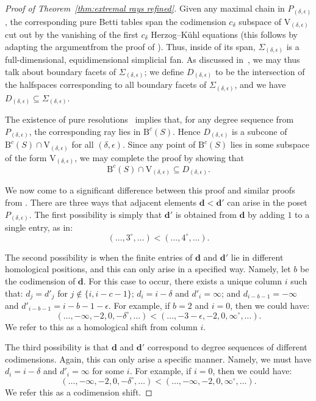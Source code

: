 \documentclass[12pt]{amsart}
\theoremstyle{definition}
\theoremstyle{remark}
\newcommand{\VV}{\mathrm{V}}
\newcommand{\cc}{c}
\newcommand{\dd}{\mathbf{d}}
\newcommand{\defi}[1]{\textsf{#1}} %
\newcommand{\BBQ}{\mathrm{B}}
\begin{document}
\begin{proof}[Proof of Theorem~\ref{thm:extremal rays refined}]
Given any maximal chain in $P_{(\delta,\epsilon)}$, the corresponding pure Betti tables span the codimension $c_{\delta}$ subspace of $\VV_{(\delta,\epsilon)}$ cut out by the vanishing of the first $c_{\delta}$ Herzog--K\"uhl equations (this follows by adapting the argumentfrom the proof of \cite[Proposition~1]{boij-sod2}).  
Thus, inside of its span, $\Sigma_{(\delta,\epsilon)}$ is a full-dimensional, equidimensional simplicial fan.  
As discussed in~\cite[Appendix]{bbeg}, we may thus talk about boundary facets of $\Sigma_{(\delta,\epsilon)}$; we define $D_{(\delta,\epsilon)}$ to be the intersection of the halfspaces corresponding to all boundary facets of $\Sigma_{(\delta,\epsilon)}$, and we have $D_{(\delta,\epsilon)} \subseteq \Sigma_{(\delta,\epsilon)}$.

The existence of pure resolutions~\cite[Theorem~0.1]{eis-schrey1} implies that, for any degree sequence from $P_{(\delta,\epsilon)}$, the corresponding ray lies in $\BBQ^{\cc}(S)$.  Hence $D_{(\delta,\epsilon)}$ is a subcone of $\BBQ^{\cc}(S)\cap \VV_{(\delta,\epsilon)}$ for all $(\delta,\epsilon)$.  
Since any point of $\BBQ^{\cc}(S)$ lies in some subspace of the form $\VV_{(\delta,\epsilon)}$, we may complete the proof by showing that
\begin{equation}\label{eqn:inclusion}
\BBQ^{\cc}(S)\cap \VV_{(\delta,\epsilon)} \subseteq D_{(\delta,\epsilon)}.
\end{equation}

We now come to a significant difference between this proof and similar proofs from \cites{eis-schrey1,boij-sod2}.  There are three ways that  adjacent elements $\dd<\dd'$ can arise in the poset $P_{(\delta,\epsilon)}$.   The first possibility is simply that $\dd'$ is obtained from $\dd$ by adding $1$ to a single entry, as in:
\[
(\dots,3^\circ,\dots)<(\dots,4^\circ,\dots).
\]

The second possibility is when the finite entries of $\dd$ and $\dd'$ lie in different homological positions, and this can only arise in a specified way.  Namely, let $b$ be the codimension of $\dd$.  For this case to occur, there exists a unique column $i$ such that: $d_j=d'_j$ for $j\notin \{i, i-c-1\}$; $d_i=i-\delta$ and $d'_i=\infty$; and $d_{i-b-1}=-\infty$ and $d'_{i-b-1}=i-b-1-\epsilon$.  For example, if $b=2$ and $i=0$, then we could have:
\[
(\dots, -\infty, -2, 0, -\delta^\circ, \dots)<(\dots, -3-\epsilon,-2, 0, \infty^\circ, \dots).
\]
We refer to this as a \defi{homological shift from column $i$}.

The third possibility is that $\dd$ and $\dd'$ correspond to degree sequences of different codimensions.  Again, this can only arise a specific manner.  Namely, we must have $d_{i}=i-\delta$ and $d'_i=\infty$ for some $i$.  
For example, if $i=0$, then we could have:
\[
(\dots, -\infty, -2, 0, -\delta^\circ, \dots)<(\dots, -\infty,-2, 0, \infty^\circ, \dots).
\]
We refer this as a \defi{codimension shift}.  



\end{proof}
\end{document}
